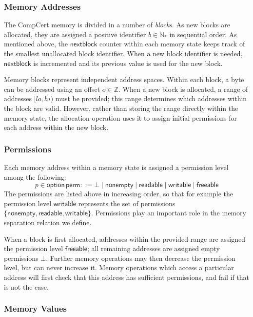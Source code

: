 \documentclass[acmsmall,screen,review,anonymous]{acmart}
\newcommand{\kw}[1]{\ensuremath{ \mathsf{#1} }}
\begin{document}
\subsubsection{Memory Addresses}

The CompCert memory is divided in a number of \emph{blocks}.
As new blocks are allocated,
they are assigned a positive identifier $b \in \mathbb{N}_*$
in sequential order.
As mentioned above,
the $\kw{nextblock}$ counter within each memory state
keeps track of the smallest unallocated block identifier.
When a new block identifier is needed,
$\kw{nextblock}$ is incremented and its previous value
is used for the new block.

Memory blocks represent independent address spaces.
Within each block,
a byte can be addressed using an offset $o \in \mathbb{Z}$.
When a new block is allocated,
a range of addresses $[\mathit{lo}, \mathit{hi})$ must be provided;
this range determines which addresses within the block are valid.
However,
rather than storing the range directly within the memory state,
the allocation operation uses it to assign initial permissions
for each address within the new block.

\subsubsection{Permissions}

Each memory address within a memory state
is assigned a permission level among the following:
\[
  p \in \kw{option}\,\kw{perm} ::=
    \bot \mid
    \kw{nonempty} \mid
    \kw{readable} \mid
    \kw{writable} \mid
    \kw{freeable}
\]
The permissions are listed above in increasing order,
so that for example the permission level $\kw{writable}$ 
represents the set of permissions
$\{ \kw{nonempty}, \kw{readable}, \kw{writable} \}$.
Permissions play an important role
in the memory separation relation we define.

When a block is first allocated,
addresses within the provided range
are assigned the permission level $\kw{freeable}$;
all remaining addresses are assigned
empty permissions $\bot$.
Further memory operations may then decrease the permission level,
but can never increase it.
Memory operations which access a particular address
will first check that this address has sufficient permissions,
and fail if that is not the case.

\subsubsection{Memory Values}
\end{document}
